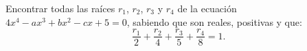 Encontrar todas las raíces $r_{1}$, $r_{2}$, $r_{3}$ y $r_{4}$ de la ecuación $4x^{4}-ax^{3}+bx^{2}-cx+5 = 0$, sabiendo que son reales, positivas y que:
\[ \frac{r_{1}}{2}+\frac{r_{2}}{4}+\frac{r_{3}}{5}+\frac{r_{4}}{8}= 1.\]
